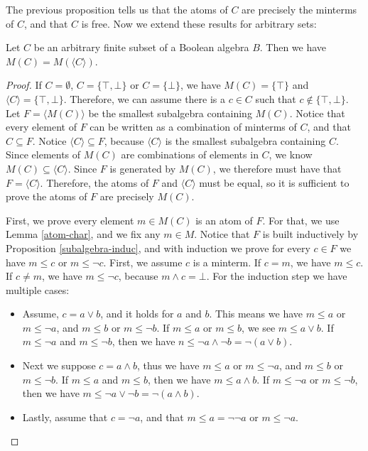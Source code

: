 The previous proposition tells us that the atoms of $C$ are precisely the minterms of $C$, and that $C$ is free. Now we extend these results for arbitrary sets:

\begin{proposition}
\label{minterms-generated}
Let $C$ be an arbitrary finite subset of a Boolean algebra $B$. Then we have $M(C) = M( \langle C \rangle )$.
\end{proposition}

\begin{proof}
If $C = \emptyset$, $C = \{\top, \bot\}$ or $C = \{\bot\}$, we have $M(C) = \{\top\}$ and $\langle C \rangle = \{\top, \bot\}$. Therefore, we can assume there is a $c \in C$ such that $c \notin \{\top, \bot\}$. Let $F = \langle M(C) \rangle$ be the smallest subalgebra containing $M(C)$. Notice that every element of $F$ can be written as a combination of minterms of $C$, and that $C \subseteq F$. Notice $\langle C \rangle \subseteq F$, because $\langle C \rangle$ is the smallest subalgebra containing $C$. Since elements of $M(C)$ are combinations of elements in $C$, we know $M(C) \subseteq \langle C \rangle$. Since $F$ is generated by $M(C)$, we therefore must have that $F = \langle C \rangle$. Therefore, the atoms of $F$ and $\langle C \rangle$ must be equal, so it is sufficient to prove the atoms of $F$ are precisely $M(C)$.

First, we prove every element $m \in M(C)$ is an atom of $F$. For that, we use Lemma \ref{atom-char}, and we fix any $m \in M$. Notice that $F$ is built inductively by Proposition \ref{subalgebra-induc}, and with induction we prove for every $c \in F$ we have $m \leq c$ or $m \leq \neg c$. First, we assume $c$ is a minterm. If $c = m$, we have $m \leq c$. If $c \neq m$, we have $m \leq \neg c$, because $m \land c = \bot$. For the induction step we have multiple cases:

\begin{itemize}
	\item Assume, $c = a \lor b$, and it holds for $a$ and $b$. This means we have $m \leq a$ or $m \leq \neg a$, and $m \leq b$ or $m \leq \neg b$. If $m \leq a$ or $m \leq b$, we see $m \leq a \lor b$. If $m \leq \neg a$ and $m \leq \neg b$, then we have $n \leq \neg a \land \neg b = \neg (a \lor b)$. 
	\item Next we suppose $c = a \land b$, thus we have $m \leq a$ or $m \leq \neg a$, and $m \leq b$ or $m \leq \neg b$. If $m \leq a$ and $m \leq b$, then we have $m \leq a \land b$. If $m \leq \neg a$ or $m \leq \neg b$, then we have $m \leq \neg a \lor \neg b = \neg (a \land b)$.
	\item Lastly, assume that $c = \neg a$, and that $m \leq a = \neg \neg a$ or $m \leq \neg a$.  
\end{itemize}


\end{proof}
